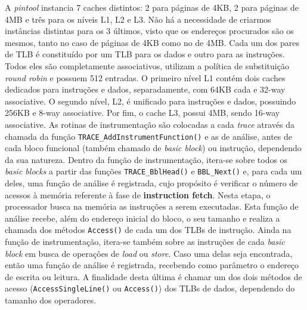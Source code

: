 \documentclass[12pt]{article}
\begin{document}
A \textit{pintool} instancia 7 caches distintos: 2 para páginas de 4KB, 2 para
páginas de 4MB e três para os níveis L1, L2 e L3. Não há a necessidade de
criarmos instâncias distintas para os 3 últimos, visto que os endereços
procurados são os mesmos, tanto no caso de páginas de 4KB como no de 4MB. Cada
um dos pares de TLB é constituído por um TLB para os dados e outro para as
instruções. Todos eles são completamente associativos, utilizam a política de
substituição \textit{round robin} e possuem 512 entradas. O
primeiro nível L1 contém dois caches dedicados para instruções e dados,
separadamente, com 64KB cada e 32-way associative. O segundo nível, L2, é
unificado para instruções e dados, possuindo 256KB e 8-way associative. Por fim,
o cache L3, possui 4MB, sendo 16-way associative. As rotinas de instrumentação são
colocadas a cada \textit{trace} através da chamada da função
\texttt{TRACE\_AddInstrumentFunction()} e as de análise, antes de cada bloco
funcional (também chamado de \textit{basic block}) ou instrução, dependendo da
sua natureza. Dentro da função de instrumentação, itera-se sobre todos os
\textit{basic blocks} a partir das funções \texttt{TRACE\_BblHead()} e
\texttt{BBL\_Next()} e, para cada um deles, uma função de análise é registrada,
cujo propósito é verificar o número de acessos à memória referente à fase de
\textbf{instruction fetch}. Nesta etapa, o processador busca na memória as
instruções a serem executadas. Esta função de análise recebe, além do endereço
inicial do bloco, o seu tamanho e realiza a chamada dos métodos
\texttt{Access()} de cada um dos TLBs de instrução. Ainda na função de
instrumentação, itera-se também sobre as instruções de cada \textit{basic block}
em busca de operações de \textit{load} ou \textit{store}. Caso uma delas seja
encontrada, então uma função de análise é registrada, recebendo como parâmetro o
endereço de escrita ou leitura. A finalidade desta última é chamar um dos dois
métodos de acesso (\texttt{AccessSingleLine()} ou \texttt{Access()}) dos TLBs de
dados, dependendo do tamanho dos operadores.
\end{document}
